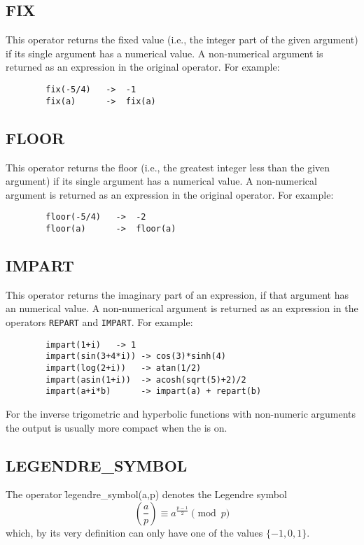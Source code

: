 \subsection{FIX}
\hypertarget{operator:FIX}{}
This operator returns the fixed value (i.e., the integer part of
the given argument) if its single argument has a numerical value.  A
non-numerical argument is returned as an expression in the original
operator.  For example:

\begin{verbatim}
        fix(-5/4)   ->  -1
        fix(a)      ->  fix(a)
\end{verbatim}

\subsection{FLOOR}
\hypertarget{operator:FLOOR}{}
This operator returns the floor (i.e., the greatest integer less than
the given argument) if its single argument has a numerical value.  A
non-numerical argument is returned as an expression in the original
operator.  For example:

\begin{verbatim}
        floor(-5/4)   ->  -2
        floor(a)      ->  floor(a)
\end{verbatim}

\subsection{IMPART}
\hypertarget{operator:IMPART}{}
This operator returns the imaginary part of an expression, if that argument
has an numerical value.  A non-numerical argument is returned as an expression
in the operators \texttt{REPART} and \texttt{IMPART}.  For example:
\begin{verbatim}
        impart(1+i)   -> 1
        impart(sin(3+4*i)) -> cos(3)*sinh(4)
        impart(log(2+i))   -> atan(1/2)
        impart(asin(1+i))  -> acosh(sqrt(5)+2)/2
        impart(a+i*b)      -> impart(a) + repart(b)
\end{verbatim}

For the inverse trigometric and hyperbolic functions with non-numeric arguments the output is usually more compact when the  is on.

\subsection{LEGENDRE\_SYMBOL}
\hypertarget{operator:LEGENDRE_SYMBOL}{}
The operator \f{legendre\_symbol}(a,p) denotes the Legendre symbol
\[
  \left(\frac{a}{p}\right) \equiv a^{\frac{p-1}{2}} \pmod{p}
\]
which, by its very definition can only have one of the values $\{-1,0,1\}$.

